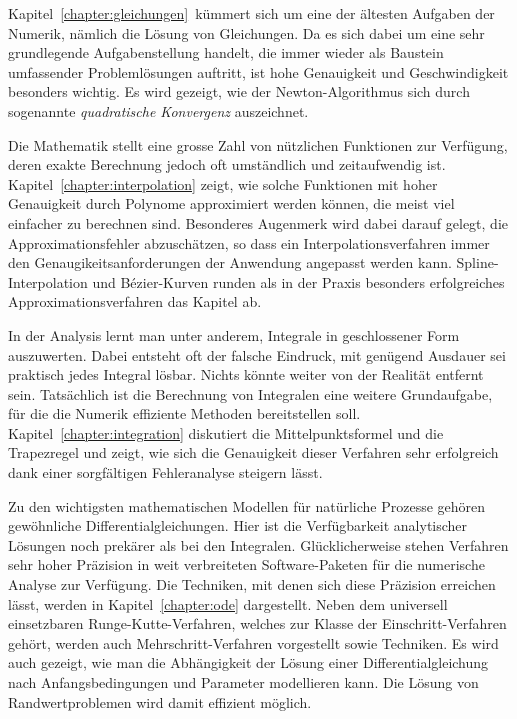 Kapitel~\ref{chapter:gleichungen} kümmert sich um eine der ältesten
Aufgaben der Numerik, nämlich die Lösung von Gleichungen.
%
%
Da es sich dabei um eine sehr grundlegende Aufgabenstellung handelt,
die immer wieder als Baustein umfassender Problemlösungen auftritt,
ist hohe Genauigkeit und Geschwindigkeit besonders wichtig.
Es wird gezeigt, wie der Newton-Algorithmus sich durch sogenannte
{\em quadratische Konvergenz} auszeichnet.
%

Die Mathematik stellt eine grosse Zahl von nützlichen Funktionen zur
Verfügung, deren exakte Berechnung jedoch oft umständlich und
zeitaufwendig ist.
%
Kapitel~\ref{chapter:interpolation} zeigt, wie solche Funktionen
mit hoher Genauigkeit durch Polynome approximiert werden können,
die meist viel einfacher zu berechnen sind.
%
Besonderes Augenmerk wird dabei darauf gelegt, die Approximationsfehler
abzuschätzen, so dass ein Interpolationsverfahren immer den
Genaugikeitsanforderungen der Anwendung angepasst werden kann.
%
Spline-Interpolation und Bézier-Kurven runden als in der Praxis besonders
erfolgreiches Approximationsverfahren das Kapitel ab.
%
%

In der Analysis lernt man unter anderem, Integrale in geschlossener
Form auszuwerten.
%
Dabei entsteht oft der falsche Eindruck, mit genügend Ausdauer sei praktisch
jedes Integral lösbar.
Nichts könnte weiter von der Realität entfernt sein.
Tatsächlich ist die Berechnung von Integralen eine weitere Grundaufgabe,
für die die Numerik effiziente Methoden bereitstellen soll.
Kapitel~\ref{chapter:integration} diskutiert die Mittelpunktsformel und
die Trapezregel und zeigt, wie sich die Genauigkeit dieser Verfahren
sehr erfolgreich dank einer sorgfältigen Fehleranalyse steigern lässt.
%
%

Zu den wichtigsten mathematischen Modellen für natürliche Prozesse
gehören gewöhnliche Differentialgleichungen.
%
%
Hier ist die Verfügbarkeit analytischer Lösungen noch prekärer als
bei den Integralen.
%
%
Glücklicherweise stehen Verfahren sehr hoher Präzision in weit
verbreiteten Software-Paketen für die numerische Analyse zur Verfügung.
%
Die Techniken, mit denen sich diese Präzision erreichen lässt,
werden in Kapitel~\ref{chapter:ode} dargestellt.
Neben dem universell einsetzbaren Runge-Kutte-Verfahren, welches zur
Klasse der Einschritt-Verfahren gehört, werden auch Mehrschritt-Verfahren
vorgestellt sowie Techniken.
%
%
Es wird auch gezeigt, wie man die Abhängigkeit der Lösung einer 
Differentialgleichung nach Anfangsbedingungen und Parameter modellieren
kann.
%
%
Die Lösung von Randwertproblemen wird damit effizient möglich.
%

